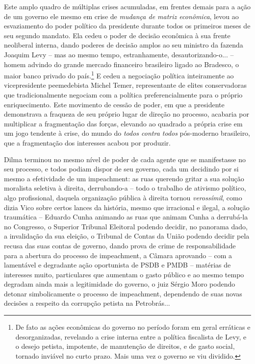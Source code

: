 Este amplo quadro de múltiplas crises acumuladas, em frentes demais para
a ação de um governo ele mesmo em crise de \emph{mudança de matriz
econômica}, levou ao esvaziamento do poder político da presidente
durante todos os primeiros meses de seu segundo mandato. Ela cedeu o
poder de decisão econômica à sua frente neoliberal interna, dando
poderes de decisão amplos ao seu ministro da fazenda Joaquim Levy -- mas
ao mesmo tempo, estranhamente, desautorizando-o... -- homem advindo do
grande mercado financeiro brasileiro ligado ao Bradesco, o maior banco
privado do país.\footnote{De fato as ações econômicas do governo no
  período foram em geral erráticas e desorganizadas, revelando a crise
  interna entre a política fiscalista de Levy, e o desejo petista,
  impotente, de manutenção de direitos, e de gasto social, tornado
  inviável no curto prazo. Mais uma vez o governo se viu dividido.} E
cedeu a negociação política inteiramente ao vicepresidente peemedebista
Michel Temer, representante de elites conservadoras que tradicionalmente
negociam com a política preferencialmente para o próprio enriquecimento.
Este movimento de cessão de poder, em que a presidente demonstrava a
fraqueza de seu próprio lugar de direção no processo, acabaria por
multiplicar a fragmentação das forças, elevando ao quadrado a própria
crise em um jogo tendente à crise, do mundo do \emph{todos contra todos}
pós-moderno brasileiro, que a fragmentação dos interesses acabou por
produzir.

Dilma terminou no mesmo nível de poder de cada agente que se
manifestasse no seu processo, e todos podiam dispor de seu governo, cada
um decidindo por si mesmo a efetividade de um impeachment: as ruas
querendo gritar a sua solução moralista seletiva à direita, derrubando-a
-- todo o trabalho de ativismo político, algo profissional, daquela
organização pública à direita tornou \emph{verossímil}, como dizia Vico
sobre certos lances da história, mesmo que irracional e ilegal, a
solução traumática -- Eduardo Cunha animando as ruas que animam Cunha a
derrubá-la no Congresso, o Superior Tribunal Eleitoral podendo decidir,
no panorama dado, a invalidação da sua eleição, o Tribunal de Contas da
União podendo decidir pela recusa das suas contas de governo, dando
prova de crime de responsabilidade para a abertura do processo de
impeachment, a Câmara aprovando -- com a lamentável e degradante ação
oportunista de PSDB e PMDB -- matérias de interesses muito, particulares
que aumentam o gasto público e ao mesmo tempo degradam ainda mais a
legitimidade do governo, o juiz Sérgio Moro podendo detonar
simbolicamente o processo de impeachment, dependendo de suas novas
decisões a respeito da corrupção petista na Petrobrás...

